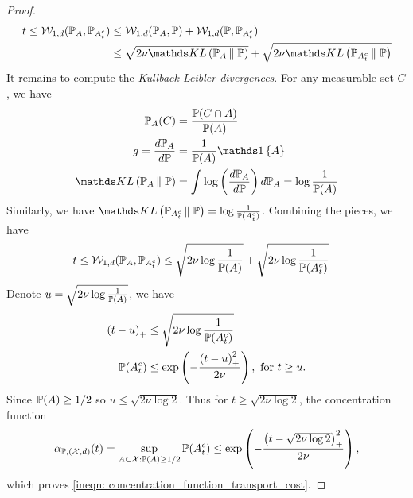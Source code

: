 \documentclass[11pt]{article}
\begin{document}
\begin{itemize}
\begin{proof}
\begin{align*}
t \le  \cW_{1, d}(\bP_A, \bP_{A_t^c}) &\le  \cW_{1, d}(\bP_A, \bP) + \cW_{1, d}(\bP, \bP_{A_t^c}) \\
&\le \sqrt{2\nu \kl{\bP_A}{\bP}} + \sqrt{2\nu \kl{\bP_{A_t^c}}{\bP}} %
\end{align*} %
It remains to compute the \emph{Kullback-Leibler divergences}. For any measurable set $C$, we
have 
\begin{align*}
\bP_A(C) &= \frac{\bP(C \cap A)}{\bP(A)}\\
g = \frac{d\bP_A }{d\bP} &= \frac{1}{\bP(A)}\ind{A}\\
\kl{\bP_A}{\bP} &= \int \log \paren{\frac{d\bP_A }{d\bP}}d\bP_A  =  \log \frac{1}{\bP(A)}
\end{align*}
Similarly, we have $\kl{\bP_{A_t^c}}{\bP} = \log \frac{1}{\bP(A_t^c)}$. Combining the pieces, we have
\begin{align*}
t \le {\mathcal W}_{1, d}({\mathbb P}_A, {\mathbb P}_{A_t^c}) &\le \sqrt{2\nu  \log \frac{1}{{\mathbb P}(A)}} + \sqrt{2\nu  \log \frac{1}{{\mathbb P}(A_t^c)}} 
\end{align*} 
Denote $u = \sqrt{2\nu  \log \frac{1}{{\mathbb P}(A)}}$, we have 
\begin{align*}
\left(t - u\right)_{+} &\le \sqrt{2\nu  \log \frac{1}{{\mathbb P}(A_t^c)}} \\
{\mathbb P}(A_t^c) &\le \exp\left(- \frac{\left(t - u\right)_{+}^2}{2\nu} \right) , \text{ for }t \ge u.
\end{align*} Since ${\mathbb P}(A) \ge 1/2$ so $u \le \sqrt{2\nu \log 2}$. Thus for $t \ge \sqrt{2\nu  \log 2}$, the concentration function
\begin{align*}
\alpha_{{\mathbb P}, ({\mathcal X}, d)}(t)  = \sup_{A\subset{\mathcal X}: {\mathbb P}(A) \ge 1/2}{\mathbb P}(A_t^c) \le \exp\left(- \frac{\left(t - \sqrt{2\nu  \log 2}\right)_{+}^2}{2\nu} \right),
\end{align*} which proves \eqref{ineqn: concentration_function_transport_cost}.




\end{proof}
\end{itemize}
\end{document}
